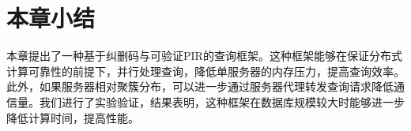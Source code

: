 \section{本章小结}

本章提出了一种基于纠删码与可验证PIR的查询框架。这种框架能够在保证分布式计算可靠性的前提下，并行处理查询，降低单服务器的内存压力，提高查询效率。此外，如果服务器相对聚簇分布，可以进一步通过服务器代理转发查询请求降低通信量。我们进行了实验验证，结果表明，这种框架在数据库规模较大时能够进一步降低计算时间，提高性能。